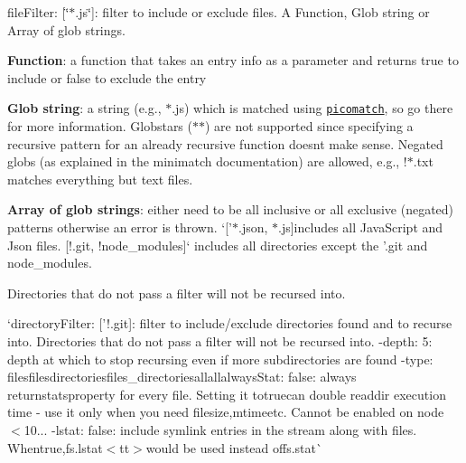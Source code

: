 \begin{DoxyItemize}
\item {\ttfamily file\+Filter\+: \mbox{[}\char`\"{}$\ast$.\+js\char`\"{}\mbox{]}}\+: filter to include or exclude files. A {\ttfamily Function}, Glob string or Array of glob strings.
\begin{DoxyItemize}
\item {\bfseries Function}\+: a function that takes an entry info as a parameter and returns true to include or false to exclude the entry
\item {\bfseries Glob string}\+: a string (e.\+g., {\ttfamily $\ast$.js}) which is matched using \href{https://github.com/micromatch/picomatch}{\tt picomatch}, so go there for more information. Globstars ({\ttfamily $\ast$$\ast$}) are not supported since specifying a recursive pattern for an already recursive function doesn\textquotesingle{}t make sense. Negated globs (as explained in the minimatch documentation) are allowed, e.\+g., {\ttfamily !$\ast$.txt} matches everything but text files.
\item {\bfseries Array of glob strings}\+: either need to be all inclusive or all exclusive (negated) patterns otherwise an error is thrown. `\mbox{[}'$\ast$.json\textquotesingle{}, \textquotesingle{}$\ast$.js\textquotesingle{}\mbox{]}{\ttfamily includes all Java\+Script and Json files. }\mbox{[}\textquotesingle{}!.git\textquotesingle{}, \textquotesingle{}!node\+\_\+modules\textquotesingle{}\mbox{]}` includes all directories except the '.git\textquotesingle{} and \textquotesingle{}node\+\_\+modules\textquotesingle{}.
\item Directories that do not pass a filter will not be recursed into.
\end{DoxyItemize}
\item `directory\+Filter\+: \mbox{[}'!.git\textquotesingle{}\mbox{]}{\ttfamily \+: filter to include/exclude directories found and to recurse into. Directories that do not pass a filter will not be recursed into. -\/}depth\+: 5{\ttfamily \+: depth at which to stop recursing even if more subdirectories are found -\/}type\+: \textquotesingle{}files\textquotesingle{}files\textquotesingle{}directories\textquotesingle{}{\ttfamily ,}\textquotesingle{}files\+\_\+directories\textquotesingle{}all\textquotesingle{}allalways\+Stat\+: false{\ttfamily \+: always return}stats{\ttfamily property for every file. Setting it to}true{\ttfamily can double readdir execution time -\/ use it only when you need file}size{\ttfamily ,}mtime{\ttfamily etc. Cannot be enabled on node $<$10... -\/}lstat\+: false{\ttfamily \+: include symlink entries in the stream along with files. When}true{\ttfamily ,}fs.\+lstat$<$tt$>$would be used instead offs.\+stat\`{}
\end{DoxyItemize}

